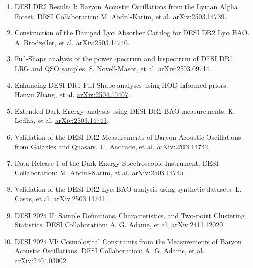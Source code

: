 \begin{enumerate}[start=17]
\item DESI DR2 Results I: Baryon Acoustic Oscillations from the Lyman Alpha Forest. 
DESI Collaboration: M. Abdul-Karim, et al. 
\href{https://arxiv.org/abs/2503.14739}{arXiv:2503.14739}.

\item Construction of the Damped Ly$\alpha$ Absorber Catalog for DESI DR2 Ly$\alpha$ BAO. 
A. Brodzeller, et al. 
\href{https://arxiv.org/abs/2503.14740}{arXiv:2503.14740}.

\item Full-Shape analysis of the power spectrum and bispectrum of DESI DR1 LRG and QSO samples. 
S. Novell-Masot, et al. 
\href{https://arxiv.org/abs/2503.09714}{arXiv:2503.09714}.

\item Enhancing DESI DR1 Full-Shape analyses using HOD-informed priors. 
Hanyu Zhang, et al. 
\href{https://arxiv.org/abs/2504.10407}{arXiv:2504.10407}.

\item Extended Dark Energy analysis using DESI DR2 BAO measurements. 
K. Lodha, et al. 
\href{https://arxiv.org/abs/2503.14743}{arXiv:2503.14743}.

\item Validation of the DESI DR2 Measurements of Baryon Acoustic Oscillations from Galaxies and Quasars. 
U. Andrade, et al. 
\href{https://arxiv.org/abs/2503.14742}{arXiv:2503.14742}.

\item Data Release 1 of the Dark Energy Spectroscopic Instrument. 
DESI Collaboration: M. Abdul-Karim, et al. 
\href{https://arxiv.org/abs/2503.14745}{arXiv:2503.14745}.

\item Validation of the DESI DR2 Ly$\alpha$ BAO analysis using synthetic datasets. 
L. Casas, et al. 
\href{https://arxiv.org/abs/2503.14741}{arXiv:2503.14741}.

\item DESI 2024 II: Sample Definitions, Characteristics, and Two-point Clustering Statistics. 
DESI Collaboration: A. G. Adame, et al. 
\href{https://arxiv.org/abs/2411.12020}{arXiv:2411.12020}.

\item DESI 2024 VI: Cosmological Constraints from the Measurements of Baryon Acoustic Oscillations. 
DESI Collaboration: A. G. Adame, et al. 
\href{https://arxiv.org/abs/2404.03002}{arXiv:2404.03002}.


\end{enumerate}
